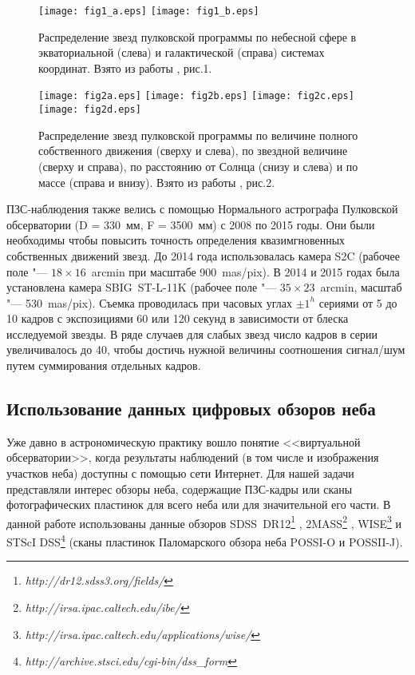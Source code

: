 \begin{figure}[h]
\centering
\texttt{[image: fig1\_a.eps]}
\texttt{[image: fig1\_b.eps]}
\caption{Распределение звезд пулковской программы по небесной сфере в экваториальной (слева) и галактической (справа) системах координат. Взято из работы \cite{2015AstL...41..833K}, рис.1.}
 \label{fig:15alloc}
\end{figure}

\begin{figure}[h]
\centering
\texttt{[image: fig2a.eps]}
\texttt{[image: fig2b.eps]}
\texttt{[image: fig2c.eps]}
\texttt{[image: fig2d.eps]}
\caption{Распределение звезд пулковской программы по величине полного собственного движения (сверху и слева), по звездной величине (сверху и справа), по расстоянию от Солнца (снизу и слева) и по массе (справа и внизу). Взято из работы \cite{2015AstL...41..833K}, рис.2.}
\label{fig:15hist}
\end{figure}

ПЗС-наблюдения также велись с помощью Нормального астрографа Пулковской обсерватории (D = 330~мм, F = 3500~мм) с 2008 по 2015 годы. Они были необходимы чтобы повысить точность определения квазимгновенных собственных движений звезд.  До 2014 года использовалась камера S2C (рабочее поле "--- $18\times16$~arcmin при масштабе 900~mas/pix). В 2014 и 2015 годах была установлена камера \mbox{SBIG ST-L-11K} (рабочее поле "--- $35\times23$~arcmin, масштаб "--- 530~mas/pix). Съемка проводилась при часовых углах $\pm1^h$ сериями от 5 до 10 кадров с экспозициями 60 или 120 секунд в зависимости от блеска исследуемой звезды. В ряде случаев для слабых звезд число кадров в серии увеличивалось до 40, чтобы достичь нужной величины соотношения сигнал/шум путем суммирования отдельных кадров.
\subsection{Использование данных цифровых обзоров неба} \label{subsec:ch3/sect2/sub2}
Уже давно в астрономическую практику вошло понятие <<виртуальной обсерватории>>, когда результаты наблюдений (в том числе и изображения участков неба) доступны с помощью сети Интернет.  Для нашей задачи представляли интерес обзоры неба, содержащие ПЗС-кадры или сканы фотографических пластинок для всего неба или для значительной его части. В данной работе использованы данные обзоров SDSS~DR12\footnote{\textit{http://dr12.sdss3.org/fields/}} \cite{2015ApJS..219...12A}, 2MASS\footnote{\textit{http://irsa.ipac.caltech.edu/ibe/}} \cite{2003tmc..book.....C}, WISE\footnote{\textit{http://irsa.ipac.caltech.edu/applications/wise/}} \cite{2010AJ....140.1868W} и STScI DSS\footnote{\textit{http://archive.stsci.edu/cgi-bin/dss\_form}} \cite{1998asal.confE...3L} (сканы пластинок Паломарского обзора неба POSSI-O и POSSII-J).


